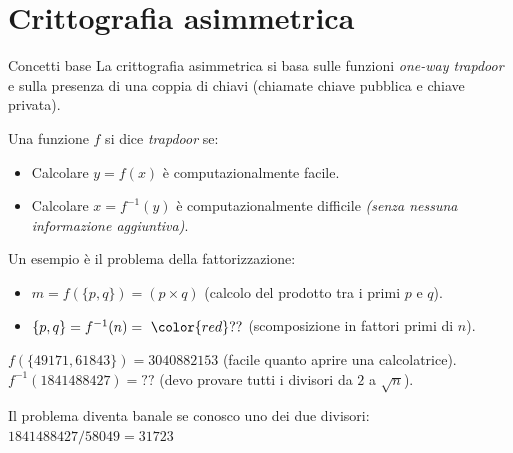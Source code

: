 \documentclass[xcolor=dvipsnames,aspectratio=169]{beamer}
\begin{document}

\part{Crittografia asimmetrica}

\begin{frame}
	\partpage
	\centering
\end{frame}

\begin{frame}{Concetti base}
  La crittografia asimmetrica si basa sulle funzioni \textit{one-way trapdoor} e sulla presenza di una coppia di chiavi (chiamate chiave pubblica e chiave privata).
  
  \pause
  
  \medskip
  
  Una funzione $f$ si dice \textit{trapdoor} se: 
  \begin{itemize}
    \item Calcolare $y = f(x)$ è computazionalmente facile.
    \item Calcolare $x = f^{-1}(y)$ è computazionalmente difficile \textit{(senza nessuna informazione aggiuntiva)}.
  \end{itemize}

  \pause
  
  \smallskip
  
  Un esempio è il problema della fattorizzazione:
  \begin{itemize}
    \item $m = f(\{p, q\}) = (p \times q)$ (calcolo del prodotto tra i primi $p$ e $q$).
    \item $\{p, q\} = f^{-1}(n) =\ {\color{red}??} $ (scomposizione in fattori primi di $n$).
  \end{itemize}
    
  \smallskip
  
  \pause
  
  $f(\{49171, 61843\}) = 3040882153$ (facile quanto aprire una calcolatrice).
  $f^{-1}(1841488427) = ??$ (devo provare tutti i divisori da $2$ a $\sqrt{n}$).
  
  \pause
  
  Il problema diventa banale se conosco uno dei due divisori:
  $1841488427 / 58049 = 31723$

\end{frame}
\end{document}
